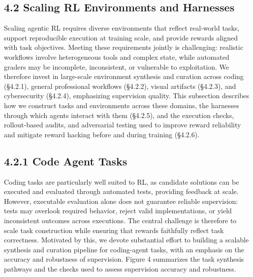 \documentclass[
  10
]{article}
\begin{document}
\subsection{4.2 Scaling RL Environments and
Harnesses}\label{scaling-rl-environments-and-harnesses}

Scaling agentic RL requires diverse environments that reflect real-world
tasks, support reproducible execution at training scale, and provide
rewards aligned with task objectives. Meeting these requirements jointly
is challenging: realistic workflows involve heterogeneous tools and
complex state, while automated graders may be incomplete, inconsistent,
or vulnerable to exploitation. We therefore invest in large-scale
environment synthesis and curation across coding (§4.2.1), general
professional workflows (§4.2.2), visual artifacts (§4.2.3), and
cybersecurity (§4.2.4), emphasizing supervision quality. This subsection
describes how we construct tasks and environments across these domains,
the harnesses through which agents interact with them (§4.2.5), and the
execution checks, rollout-based audits, and adversarial testing used to
improve reward reliability and mitigate reward hacking before and during
training (§4.2.6).

\subsection{4.2.1 Code Agent Tasks}\label{code-agent-tasks}

Coding tasks are particularly well suited to RL, as candidate solutions
can be executed and evaluated through automated tests, providing
feedback at scale. However, executable evaluation alone does not
guarantee reliable supervision: tests may overlook required behavior,
reject valid implementations, or yield inconsistent outcomes across
executions. The central challenge is therefore to scale task
construction while ensuring that rewards faithfully reflect task
correctness. Motivated by this, we devote substantial effort to building
a scalable synthesis and curation pipeline for coding-agent tasks, with
an emphasis on the accuracy and robustness of supervision. Figure 4
summarizes the task synthesis pathways and the checks used to assess
supervision accuracy and robustness.
\end{document}
